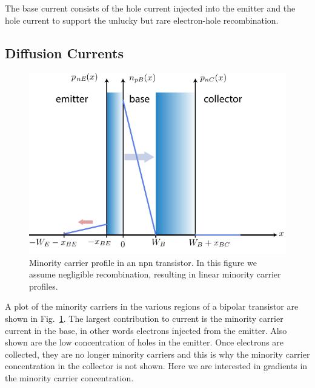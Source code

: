 The base current consists of the hole current injected into the emitter and the hole current to support the unlucky but rare electron-hole recombination.  
\subsection{Diffusion Currents}
\begin{figure}[tb]
\begin{center}
\includegraphics[width=.75\columnwidth]{slide10_minority_carriers}
\end{center}
\caption{Minority carrier profile in an npn transistor.  In this figure we assume negligible recombination, resulting in linear minority carrier profiles.}
\label{fig:slide10_minority_carriers}
\end{figure}

A plot of the minority carriers in the various regions of a bipolar transistor are shown in Fig.~\ref{fig:slide10_minority_carriers}.  The largest contribution to current is the minority carrier current in the base, in other words electrons injected from the emitter.  Also shown are the low concentration of holes in the emitter.  Once electrons are collected, they are no longer minority carriers and this is why the minority carrier concentration in the collector is not shown.  Here we are interested in gradients in the minority carrier concentration.
